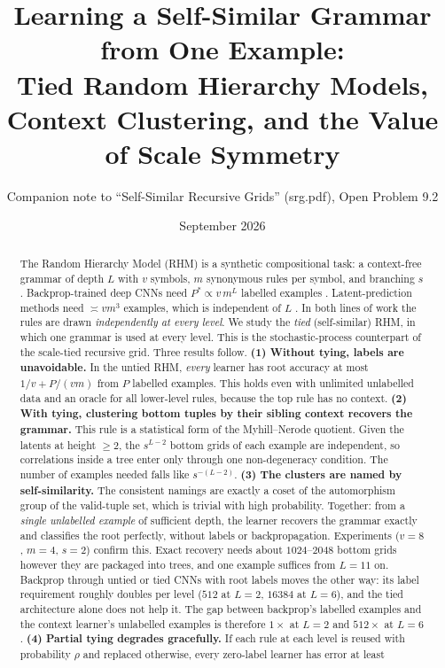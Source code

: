 \documentclass[11pt]{article}
\title{Learning a Self-Similar Grammar from One Example:\\
Tied Random Hierarchy Models, Context Clustering, and the Value of Scale Symmetry}
\author{Companion note to ``Self-Similar Recursive Grids'' (srg.pdf), Open Problem 9.2}
\date{September 2026}
\theoremstyle{definition}
\begin{document}
\maketitle

\begin{abstract}
The Random Hierarchy Model (RHM) is a synthetic compositional task: a context-free grammar of
depth $L$ with $v$ symbols, $m$ synonymous rules per symbol, and branching $s$. Backprop-trained
deep CNNs need $P^*\propto v\,m^L$ labelled examples \cite{cagnetta2024}. Latent-prediction
methods need $\asymp v m^3$ examples, which is independent of $L$ \cite{korchinski2026}. In both
lines of work the rules are drawn \emph{independently at every level}. We study the
\emph{tied} (self-similar) RHM, in which one grammar is used at every level. This is the
stochastic-process counterpart of the scale-tied recursive grid. Three results follow.
\textbf{(1) Without tying, labels are unavoidable.} In the untied RHM, \emph{every} learner has
root accuracy at most $1/v+P/(vm)$ from $P$ labelled examples. This holds even with unlimited
unlabelled data and an oracle for all lower-level rules, because the top rule has no context.
\textbf{(2) With tying, clustering bottom tuples by their sibling context recovers the grammar.}
This rule is a statistical form of the Myhill--Nerode quotient. Given the latents at height
$\ge2$, the $s^{L-2}$ bottom grids of each example are independent, so correlations inside a
tree enter only through one non-degeneracy condition. The number of examples needed falls like
$s^{-(L-2)}$. \textbf{(3) The clusters are named by self-similarity.} The consistent namings are
exactly a coset of the automorphism group of the valid-tuple set, which is trivial with high
probability. Together: from a \emph{single unlabelled example} of sufficient depth, the learner
recovers the grammar exactly and classifies the root perfectly, without labels or backpropagation.
Experiments ($v{=}8$, $m{=}4$, $s{=}2$) confirm this. Exact recovery needs about $1024$--$2048$ bottom
grids however they are packaged into trees, and one example suffices from $L=11$ on. Backprop through
untied or tied CNNs with root labels moves the other way: its label requirement roughly doubles
per level ($512$ at $L=2$, $16384$ at $L=6$), and the tied architecture alone does not help it.
The gap between backprop's labelled examples and the context learner's unlabelled examples is
therefore $1\times$ at $L=2$ and $512\times$ at $L=6$.
\textbf{(4) Partial tying degrades gracefully.} If each rule at each level is reused with
probability $\rho$ and replaced otherwise, every zero-label learner has error at least

\end{abstract}
\end{document}
